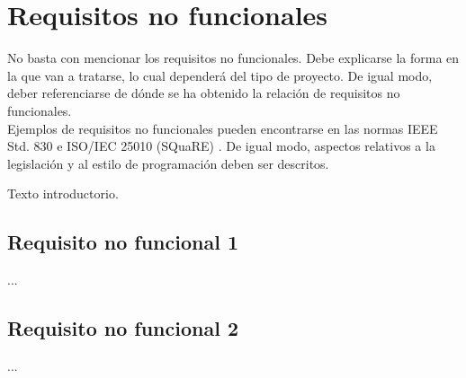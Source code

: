 \section{\forlnameref Requisitos no funcionales}
\label{sec:nonFunctionalReqs}

\begin{shaded}
No basta con mencionar los requisitos no funcionales. Debe explicarse la forma en la que van a tratarse, lo cual dependerá del tipo de proyecto. De igual modo, deber referenciarse de dónde se ha obtenido la relación de requisitos no funcionales.\\

Ejemplos de requisitos no funcionales pueden encontrarse en las normas IEEE Std. 830 \cite{ieee1998std830} e ISO/IEC 25010 (SQuaRE) \cite{iso2011systems25010}. De igual modo, aspectos relativos a la legislación y al estilo de programación deben ser descritos.
\end{shaded}

Texto introductorio.

\subsection*{\forlnameref Requisito no funcional 1}
\label{sec:nfr1} %

...

\subsection*{\forlnameref Requisito no funcional 2}
\label{sec:nfr2} %

...